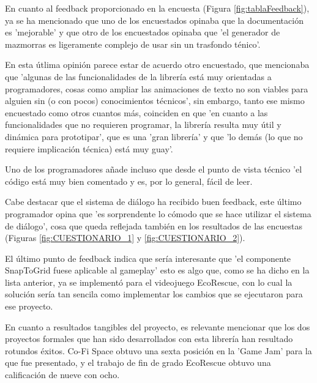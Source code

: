 En cuanto al feedback proporcionado en la encuesta (Figura \ref{fig:tablaFeedback}), ya se ha mencionado que uno de los encuestados opinaba que la documentación es 'mejorable' y que otro de los encuestados opinaba 
que 'el generador de mazmorras es ligeramente complejo de usar sin un trasfondo ténico'. 

En esta útlima opinión parece estar de acuerdo otro encuestado, que mencionaba que 'algunas de las funcionalidades de la
 librería está muy orientadas a programadores, cosas como ampliar las animaciones de texto no son viables para alguien sin (o con pocos) conocimientos técnicos', sin embargo, tanto ese mismo encuestado como otros 
 cuantos más, coinciden en que 'en cuanto a las funcionalidades que no requieren programar, la librería resulta muy útil y dinámica para prototipar', que es una 'gran librería' y que 'lo demás (lo que no requiere
 implicación técnica) está muy guay'. 
 
 Uno de los programadores añade incluso que desde el punto de vista técnico 'el código está muy bien comentado y es, por lo general, fácil de leer. 
 
 Cabe destacar que el sistema de diálogo ha recibido buen feedback, este último programador opina que 'es sorprendente lo cómodo que se hace utilizar el sistema de diálogo', cosa que queda reflejada también
  en los resultados de las encuestas (Figuras \ref{fig:CUESTIONARIO_1} y \ref{fig:CUESTIONARIO_2}).
  
  El último punto de feedback indica que sería interesante que 'el componente SnapToGrid fuese aplicable al gameplay'
  esto es algo que, como se ha dicho en la lista anterior, ya se implementó para el videojuego EcoRescue, con lo cual la solución sería tan sencila como implementar los cambios que se ejecutaron para ese proyecto.

En cuanto a resultados tangibles del proyecto, es relevante mencionar que los dos proyectos formales que han sido desarrollados con esta librería han resultado rotundos éxitos. Co-Fi Space obtuvo una sexta posición en 
la 'Game Jam' para la que fue presentado, y el trabajo de fin de grado EcoRescue obtuvo una calificación de nueve con ocho. 

